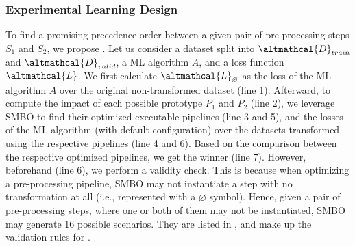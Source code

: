 \subsubsection{Experimental Learning Design}
To find a promising precedence order between a given pair of pre-processing steps $S_1$ and $S_2$, we propose .
Let us consider a dataset split into $\altmathcal{D}_{train}$ and $\altmathcal{D}_{valid}$, a ML algorithm $A$, and a loss function $\altmathcal{L}$.
We first calculate $\altmathcal{L}_{\varnothing}$ as the loss of the ML algorithm $A$ over the original non-transformed dataset (line 1). %
Afterward, to compute the impact of each possible prototype $P_1$ and $P_2$ (line 2),
we leverage SMBO to find their optimized executable pipelines (line 3 and 5), and the losses of the ML algorithm (with default configuration) over the datasets transformed using the respective pipelines (line 4 and 6).
Based on the comparison between the respective optimized pipelines, we get the winner (line 7).
However, beforehand (line 6), we perform a validity check.
This is because when optimizing a pre-processing pipeline, SMBO may not instantiate a step with no transformation at all (i.e., represented with a $\varnothing$ symbol).
Hence, given a pair of pre-processing steps, where one or both of them may not be instantiated, SMBO may generate 16 possible scenarios.
They are listed in , and make up the validation rules for .

